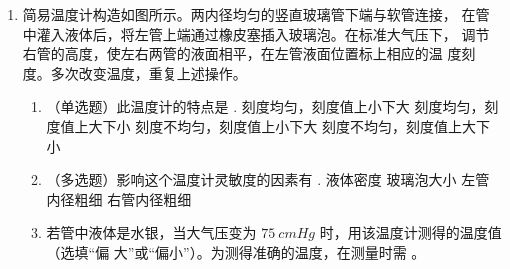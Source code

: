 \begin{enumerate}
\item 
{}
简易温度计构造如图所示。两内径均匀的竖直玻璃管下端与软管连接，
在管中灌入液体后，将左管上端通过橡皮塞插入玻璃泡。在标准大气压下，
调节右管的高度，使左右两管的液面相平，在左管液面位置标上相应的温
度刻度。多次改变温度，重复上述操作。
\begin{figure}[h!]
	\centering
	
\end{figure}
\begin{enumerate}
	\item
（单选题）此温度计的特点是 \underlinegap .
\fourchoices
{刻度均匀，刻度值上小下大}
{刻度均匀，刻度值上大下小}
{刻度不均匀，刻度值上小下大}
{刻度不均匀，刻度值上大下小}

\item 
（多选题）影响这个温度计灵敏度的因素有 \underlinegap .
\fourchoices
{液体密度}
{玻璃泡大小}
{左管内径粗细}
{右管内径粗细}


\item 
若管中液体是水银，当大气压变为 $ 75 \ cm Hg $ 时，用该温度计测得的温度值 \underlinegap （选填“偏
大”或“偏小”）。为测得准确的温度，在测量时需
 \hfullline 
。
	
\end{enumerate}




	
	
	
\end{enumerate}

